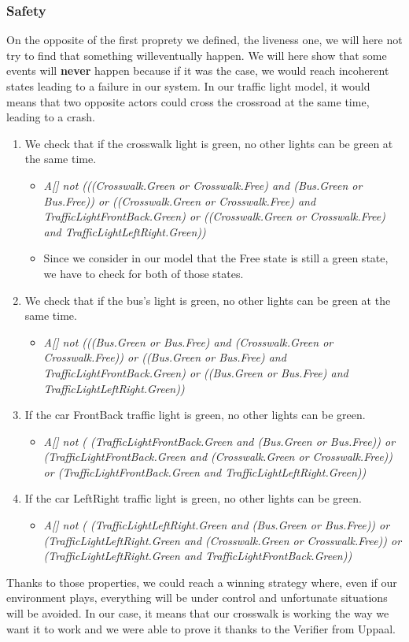 \subsubsection{Safety} 
On the opposite of the first proprety we defined, the liveness one, we will here not try to find that something willeventually happen. We will here show that some events will \textbf{never} happen because if it was the case, we would reach incoherent states leading to a failure in our system. In our traffic light model, it would means that two opposite actors could cross the crossroad at the same time, leading to a crash. 
\begin{enumerate}
  \item We check that if the crosswalk light is green, no other lights can be green at the same time.
  \begin{itemize}
    \item \textit{A[] not (((Crosswalk.Green or Crosswalk.Free) and  (Bus.Green or Bus.Free)) or ((Crosswalk.Green or Crosswalk.Free) and TrafficLightFrontBack.Green) or ((Crosswalk.Green or Crosswalk.Free) and TrafficLightLeftRight.Green))}
    \item Since we consider in our model that the Free state is still a green state, we have to check for both of those states.
  \end{itemize}
  \item We check that if the bus's light is green, no other lights can be green at the same time.
  \begin{itemize}
    \item \textit{A[] not (((Bus.Green or Bus.Free) and  (Crosswalk.Green or Crosswalk.Free)) or ((Bus.Green or Bus.Free) and TrafficLightFrontBack.Green) or ((Bus.Green or Bus.Free) and TrafficLightLeftRight.Green))}
  \end{itemize}
  \item If the car FrontBack traffic light is green, no other lights can be green.
  \begin{itemize}
    \item \textit{A[] not ( (TrafficLightFrontBack.Green and (Bus.Green or Bus.Free)) or (TrafficLightFrontBack.Green and (Crosswalk.Green or Crosswalk.Free)) or (TrafficLightFrontBack.Green and TrafficLightLeftRight.Green))}
  \end{itemize}
  \item If the car LeftRight traffic light is green, no other lights can be green.
  \begin{itemize}
    \item \textit{A[] not ( (TrafficLightLeftRight.Green and (Bus.Green or Bus.Free)) or (TrafficLightLeftRight.Green and (Crosswalk.Green or Crosswalk.Free)) or (TrafficLightLeftRight.Green and TrafficLightFrontBack.Green))}
  \end{itemize}
\end{enumerate}
Thanks to those properties, we could reach a winning strategy where, even if our environment plays, everything will be under control and unfortunate situations will be avoided. In our case, it means that our crosswalk is working the way we want it to work and we were able to prove it thanks to the Verifier from Uppaal.
